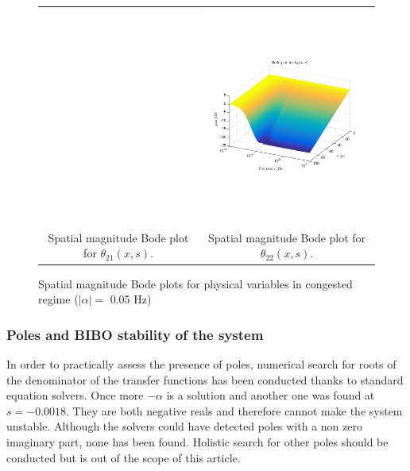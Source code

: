 \documentclass[preprint]{elsarticle}
\begin{document}
\begin{figure}
\begin{tabular}{cc}
&
\includegraphics[trim = 0mm 60mm 0mm 60mm, width = 8cm]{distr_theta_22}
\tabularnewline
Spatial magnitude Bode plot for $\theta_{21}(x,s)$.
&
Spatial magnitude Bode plot for $\theta_{22}(x,s)$.
\tabularnewline
\end{tabular}
\caption{Spatial magnitude Bode plots for physical variables in congested regime ($\left|\alpha\right| = $ 0.05 Hz)\label{fig:Magn_spatial_physx_congested}}
\end{figure}

\subsubsection{Poles and BIBO stability of the system}
In order to practically assess the presence of poles, numerical search for roots of the denominator of the transfer functions has been conducted thanks to standard equation solvers. Once more $-\alpha$ is a solution and another one was found at $s=-0.0018$. They are both negative reals and therefore cannot make the system unstable. Although the solvers could have detected poles with a non zero imaginary part, none has been found. Holistic search for other poles should be conducted but is out of the scope of this article.
\end{document}
